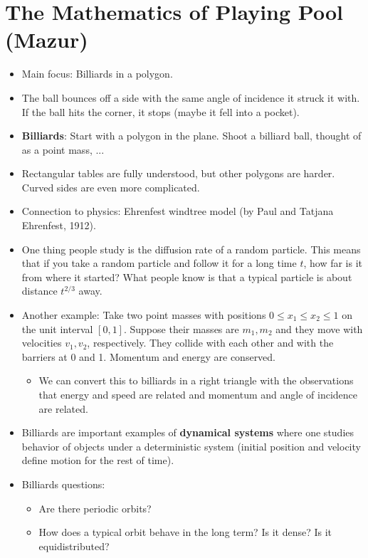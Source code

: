 \documentclass[../apprentice.tex]{subfiles}
\begin{document}
\section{The Mathematics of Playing Pool (Mazur)}
\begin{itemize}
    \item Main focus: Billiards in a polygon.
    \item The ball bounces off a side with the same angle of incidence it struck it with. If the ball hits the corner, it stops (maybe it fell into a pocket).
    \item \textbf{Billiards}: Start with a polygon in the plane. Shoot a billiard ball, thought of as a point mass, ...
    \item Rectangular tables are fully understood, but other polygons are harder. Curved sides are even more complicated.
    \item Connection to physics: Ehrenfest windtree model (by Paul and Tatjana Ehrenfest, 1912).
    \item One thing people study is the diffusion rate of a random particle. This means that if you take a random particle and follow it for a long time $t$, how far is it from where it started? What people know is that a typical particle is about distance $t^{2/3}$ away.
    \item Another example: Take two point masses with positions $0\leq x_1\leq x_2\leq 1$ on the unit interval $[0,1]$. Suppose their masses are $m_1,m_2$ and they move with velocities $v_1,v_2$, respectively. They collide with each other and with the barriers at 0 and 1. Momentum and energy are conserved.
    \begin{itemize}
        \item We can convert this to billiards in a right triangle with the observations that energy and speed are related and momentum and angle of incidence are related.
    \end{itemize}
    \item Billiards are important examples of \textbf{dynamical systems} where one studies behavior of objects under a deterministic system (initial position and velocity define motion for the rest of time).
    \item Billiards questions:
    \begin{itemize}
        \item Are there periodic orbits?
        \item How does a typical orbit behave in the long term? Is it dense? Is it equidistributed?

\end{itemize}
\end{itemize}
\end{document}
